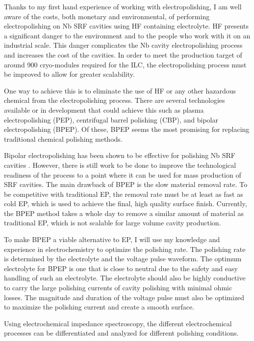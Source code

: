 \documentclass[]{revtex4-2}
\begin{document}
    Thanks to my first hand experience of working with electropolishing, I am well aware of the costs, both monetary and environmental, of performing electropolishing on Nb SRF cavities using HF containing electrolyte. HF presents a significant danger to the environment and to the people who work with it on an industrial scale. This danger complicates the Nb cavity electropolishing process and increases the cost of the cavities. In order to meet the production target of around 900 cryo-modules required for the ILC, the electropolishing process must be improved to allow for greater scalability.

    One way to achieve this is to eliminate the use of HF or any other hazardous chemical from the electropolishing process. There are several technologies available or in development that could achieve this such as plasma electropolishing (PEP), centrifugal barrel polishing (CBP), and bipolar electropolishing (BPEP). Of these, BPEP seems the most promising for replacing traditional chemical polishing methods.

    Bipolar electropolishing has been shown to be effective for polishing Nb SRF cavities \cite{?}. However, there is still work to be done to improve the technological readiness of the process to a point where it can be used for mass production of SRF cavities. The main drawback of BPEP is the slow material removal rate. To be competitive with traditional EP, the removal rate must be at least as fast as cold EP, which is used to achieve the final, high quality surface finish. Currently, the BPEP method takes a whole day to remove a similar amount of material as traditional EP, which is not scalable for large volume cavity production.

    To make BPEP a viable alternative to EP, I will use my knowledge and experience in electrochemistry to optimize the polishing rate. The polishing rate is determined by the electrolyte and the voltage pulse waveform. The optimum electrolyte for BPEP is one that is close to neutral due to the safety and easy handling of such an electrolyte. The electrolyte should also be highly conductive to carry the large polishing currents of cavity polishing with minimal ohmic losses. The magnitude and duration of the voltage pulse must also be optimized to maximize the polishing current and create a smooth surface.

    

    Using electrochemical impedance spectroscopy, the different electrochemical processes can be differentiated and analyzed for different polishing conditions.
\end{document}
